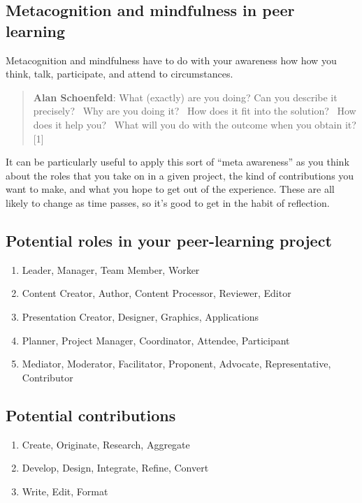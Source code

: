 \subsection{Metacognition and mindfulness in peer learning}

Metacognition and mindfulness have to do with your awareness how how you
think, talk, participate, and attend to circumstances.

\begin{quote}
\textbf{Alan Schoenfeld}: What (exactly) are you doing? Can you describe
it precisely?~ Why are you doing it?~ How does it fit into the
solution?~ How does it help you?~ What will you do with the outcome when
you obtain it? {[}1{]}
\end{quote}

It can be particularly useful to apply this sort of ``meta awareness''
as you think about the roles that you take on in a given project, the
kind of contributions you want to make, and what you hope to get out of
the experience. These are all likely to change as time passes, so it's
good to get in the habit of reflection.

\subsection{Potential roles in your peer-learning project}

\begin{enumerate}
\itemsep1pt\parskip0pt
\item
  Leader, Manager, Team Member, Worker
\item
  Content Creator, Author, Content Processor, Reviewer, Editor
\item
  Presentation Creator, Designer, Graphics, Applications
\item
  Planner, Project Manager, Coordinator, Attendee, Participant
\item
  Mediator, Moderator, Facilitator, Proponent, Advocate, Representative,
  Contributor
\end{enumerate}

\subsection{Potential contributions}

\begin{enumerate}
\itemsep1pt\parskip0pt
\item
  Create, Originate, Research, Aggregate
\item
  Develop, Design, Integrate, Refine, Convert
\item
  Write, Edit, Format
\end{enumerate}


